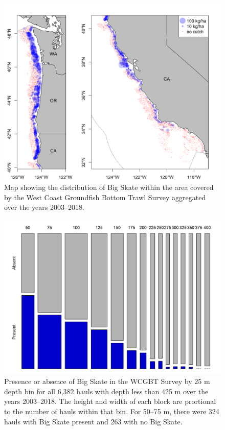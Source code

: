 \documentclass[]{article}
\begin{document}
\begin{figure}[!h]
\begin{centering}
\includegraphics{Figures/survey_hauls_map.png}
\caption{Map showing the distribution of Big Skate within the area covered by the West Coast Groundfish Bottom Trawl Survey aggregated over the years 2003--2018.}\label{fig:survey_hauls_map}
\end{centering}
\end{figure}

\newpage

\FloatBarrier

\begin{figure}
\centering
\includegraphics{Figures/WCGBTS_presence_absence_by_depth_bin.png}
\caption{Presence or absence of Big Skate in the WCGBT Survey by 25 m
depth bin for all 6,382 hauls with depth less than 425 m over the years
2003--2018. The height and width of each block are prortional to the
number of hauls within that bin. For 50--75 m, there were 324 hauls with
Big Skate present and 263 with no Big
Skate.\label{fig:WCGBTS_presence_absence_by_depth_bin}}
\end{figure}
\end{document}
